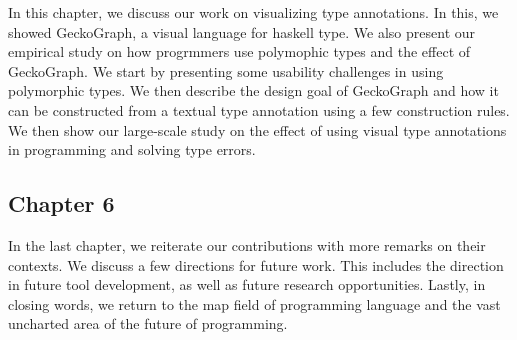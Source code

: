 In this chapter, we discuss our work on visualizing type annotations. In this, we showed GeckoGraph, a visual  language for haskell type. We also present our empirical study on how progrmmers use polymophic types and the effect of GeckoGraph. We start by presenting some usability challenges in using polymorphic types. We then describe the design goal of GeckoGraph and how it can be constructed from a textual type annotation using a few construction rules. We then show our large-scale study on the effect of using visual type annotations in programming and solving type errors. 


\subsection{Chapter 6}

In the last chapter, we reiterate our contributions with more remarks on their contexts. We discuss a few directions for future work. This includes the direction in future tool development, as well as future research opportunities. Lastly, in closing words, we return to the map field of programming language and the vast uncharted area of the future of programming. 